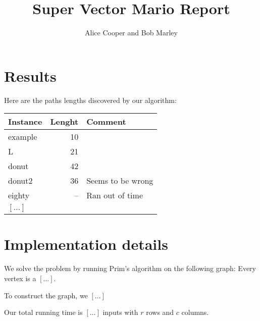 \documentclass{tufte-handout}
\title{Super Vector Mario Report}
\author{Alice Cooper and Bob Marley}
\begin{document}
  \maketitle

  \section{Results}

  Here are the paths lengths discovered by our algorithm:

\bigskip
  \begin{tabular}{lrl}\toprule
    Instance & Lenght & Comment  \\\midrule
    example & 10 &  \\
    L & 21 & \\
    donut & 42 \\
    donut2 & 36 & Seems to be wrong\\
    eighty & -- & Ran out of time\\
    $[\ldots]$ \\\bottomrule
  \end{tabular}
\bigskip


  \section{Implementation details}

  We solve the problem by running Prim's algorithm
  on the following graph:
  Every vertex is a $[\ldots]$.

  To construct the graph, we $[\ldots]$

  Our total running time is $[\ldots]$ inputs with $r$ rows and $c$ columns.
\end{document}
